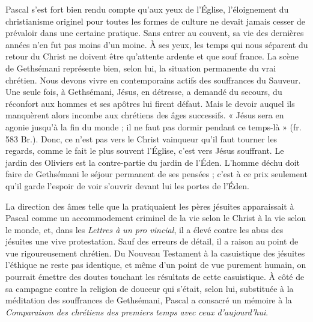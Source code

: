 \documentclass[12pt,a4paper]{article}
\begin{document}
Pascal s'est fort bien rendu compte qu'aux yeux de l'Église, l'éloignement
du christianisme originel pour toutes les formes de culture
ne devait jamais cesser de prévaloir dans une certaine pratique.
Sans entrer au couvent, sa vie des dernières années n'en fut pas
moins d'un moine. À ses yeux, les temps qui nous séparent du
retour du Christ ne doivent être qu'attente ardente et que souf\-%
france. La scène de Gethsémani représente bien, selon lui, la situation
permanente du vrai chrétien. Nous devons vivre en contemporains
actifs des souffrances du Sauveur. Une seule fois, à Gethsémani,
Jésus, en détresse, a demandé du secours, du réconfort aux hommes
et ses apôtres lui firent défaut. Mais le devoir auquel ils manquèrent
alors incombe aux chrétiens des âges successifs. « Jésus
sera en agonie jusqu'à la fin du monde ; il ne faut pas dormir pendant
ce temps-là » (fr. 583 Br.). Donc, ce n'est pas vers le Christ
vainqueur qu'il faut tourner les regards, comme le fait le plus souvent
l'Église, c'est vers Jésus souffrant. Le jardin des Oliviers est la
contre-partie du jardin de l'Éden. L'homme déchu doit faire de
Gethsémani le séjour permanent de ses pensées ; c'est à ce prix
seulement qu'il garde l'espoir de voir s'ouvrir devant lui les portes
de l'Éden.

La direction des âmes telle que la pratiquaient les pères jésuites
apparaissait à Pascal comme un accommodement criminel de la vie
selon le Christ à la vie selon le monde, et, dans les \emph{Lettres à un pro\-%
vincial}, il a élevé contre les abus des jésuites une vive protestation.
Sauf des erreurs de détail, il a raison au point de vue rigoureusement
chrétien. Du Nouveau Testament à la casuistique des jésuites l'éthique
ne reste pas identique, et même d'un point de vue purement humain,
on pourrait émettre des doutes touchant les résultats de cette casuistique.
À côté de sa campagne contre la religion de douceur qui s'était,
selon lui, substituée à la méditation des souffrances de Gethsémani,
Pascal a consacré un mémoire à la \emph{Comparaison des chrétiens des
premiers temps avec ceux d'aujourd'hui}.
\end{document}
